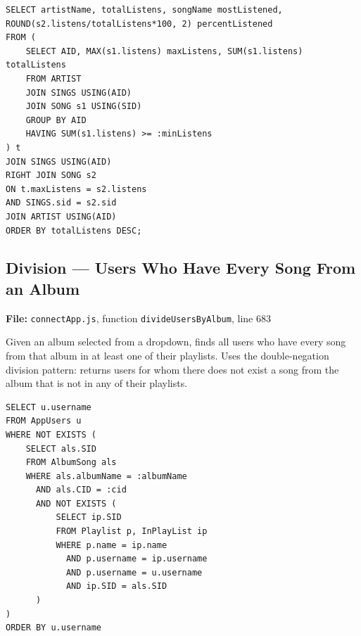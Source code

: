 \documentclass{article}
\begin{document}
\begin{lstlisting}
SELECT artistName, totalListens, songName mostListened, ROUND(s2.listens/totalListens*100, 2) percentListened
FROM (
    SELECT AID, MAX(s1.listens) maxListens, SUM(s1.listens) totalListens
    FROM ARTIST
    JOIN SINGS USING(AID)
    JOIN SONG s1 USING(SID)
    GROUP BY AID
    HAVING SUM(s1.listens) >= :minListens
) t
JOIN SINGS USING(AID)
RIGHT JOIN SONG s2
ON t.maxListens = s2.listens
AND SINGS.sid = s2.sid
JOIN ARTIST USING(AID)
ORDER BY totalListens DESC;
\end{lstlisting}

\subsection{Division --- Users Who Have Every Song From an Album}

\textbf{File:} \texttt{connectApp.js}, function \texttt{divideUsersByAlbum}, line 683

Given an album selected from a dropdown, finds all users who have every song
from that album in at least one of their playlists. Uses the double-negation
division pattern: returns users for whom there does not exist a song from the
album that is not in any of their playlists.

\begin{lstlisting}
SELECT u.username
FROM AppUsers u
WHERE NOT EXISTS (
    SELECT als.SID
    FROM AlbumSong als
    WHERE als.albumName = :albumName
      AND als.CID = :cid
      AND NOT EXISTS (
          SELECT ip.SID
          FROM Playlist p, InPlayList ip
          WHERE p.name = ip.name
            AND p.username = ip.username
            AND p.username = u.username
            AND ip.SID = als.SID
      )
)
ORDER BY u.username
\end{lstlisting}
\end{document}
